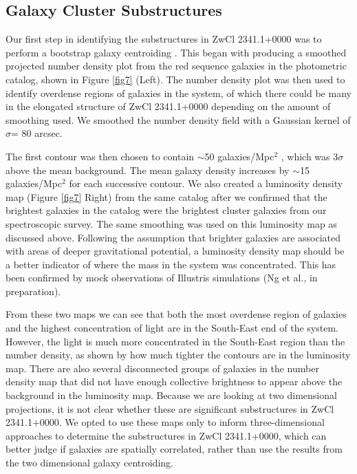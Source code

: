 \documentclass[onecolumn]{aastex}
\begin{document}
\subsection{Galaxy Cluster Substructures}
Our first step in identifying the substructures in ZwCl 2341.1+0000 was to perform a bootstrap galaxy centroiding \citep{Dawson12}.  This began with producing a smoothed projected number density plot from the red sequence galaxies in the photometric catalog, shown in Figure \ref{fig7} (Left).  The number density plot was then used to identify overdense regions of galaxies in the system, of which there could be many in the elongated structure of ZwCl 2341.1+0000 depending on the amount of smoothing used.  We smoothed the number density field with a Gaussian kernel of $\sigma$= 80 arcsec.

The first contour was then chosen to contain $\sim$50 galaxies/Mpc$^2$ , which was 3$\sigma$ above the mean background.  The mean galaxy density increases by $\sim$15 galaxies/Mpc$^2$ for each successive contour.  We also created a luminosity density map (Figure \ref{fig7} Right) from the same catalog after we confirmed that the brightest galaxies in the catalog were the brightest cluster galaxies from our spectroscopic survey.  The same smoothing was used on this luminosity map as discussed above.  Following the assumption that brighter galaxies are associated with areas of deeper gravitational potential, a luminosity density map should be a better indicator of where the mass in the system was concentrated.  This has been confirmed by mock observations of Illustris simulations (Ng et al., in preparation).  

From these two maps we can see that both the most overdense region of galaxies and the highest concentration of light are in the South-East end of the system.  However, the light is much more concentrated in the South-East region than the number density, as shown by how much tighter the contours are in the luminosity map.  There are also several disconnected groups of galaxies in the number density map that did not have enough collective brightness to appear above the background in the luminosity map.  Because we are looking at two dimensional projections, it is not clear whether these are significant substructures in ZwCl 2341.1+0000.  We opted to use these maps only to inform three-dimensional approaches to determine the substructures in ZwCl 2341.1+0000, which can better judge if galaxies are spatially correlated, rather than use the results from the two dimensional galaxy centroiding.
\end{document}
